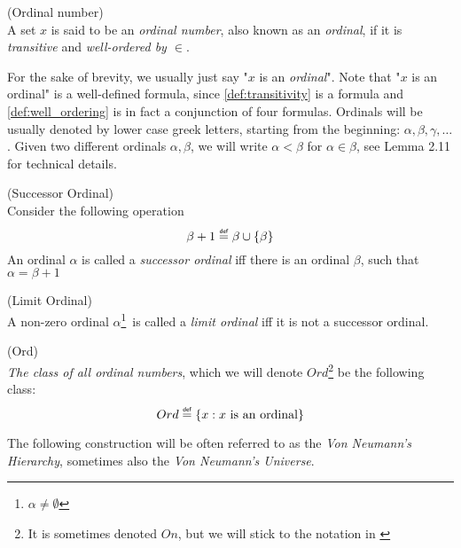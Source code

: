 \begin{definition}{(Ordinal number)}\label{def:ordinal}\\
A set $x$ is said to be an \emph{ordinal number}, also known as an \emph{ordinal}, if it is \emph{transitive} and \emph{well-ordered by $\in$}. 
\end{definition}
For the sake of brevity, we usually just say "$x$ is an \emph{ordinal}". 
Note that "$x$ is an ordinal" is a well-defined formula, since \ref{def:transitivity} is a formula and \ref{def:well_ordering} is in fact a conjunction of four formulas.
Ordinals will be usually denoted by lower case greek letters, starting from the beginning: $\alpha, \beta, \gamma, \ldots$.
Given two different ordinals $\alpha, \beta$, we will write $\alpha < \beta$ for $\alpha \in \beta$, see \cite{JechBook}{Lemma 2.11} for technical details.

\begin{definition}{(Successor Ordinal)}\label{def:successor_ordinal}\\
Consider the following operation
\begin{equation}
\beta + 1 \defeq \beta \cup \{\beta\}
\end{equation}
An ordinal $\alpha$ is called a \emph{successor ordinal} iff there is an ordinal $\beta$, such that $\alpha = \beta+1$
\end{definition}

\begin{definition}{(Limit Ordinal)}\label{def:limit_ordinal}\\
A non-zero ordinal $\alpha$\footnote{$\alpha \neq \emptyset$} is called a \emph{limit ordinal} iff it is not a successor ordinal.
\end{definition}

\begin{definition}{(Ord)}\label{def:ord}\\
\emph{The class of all ordinal numbers}, which we will denote $Ord$\footnote{It is sometimes denoted $On$, but we will stick to the notation in \cite{JechBook}} be the following class:
\begin{equation}
Ord \defeq \{x : x\mbox{ is an ordinal}\}
\end{equation}
\end{definition}

The following construction will be often referred to as the \emph{Von Neumann's Hierarchy}, sometimes also the \emph{Von Neumann's Universe}. %

